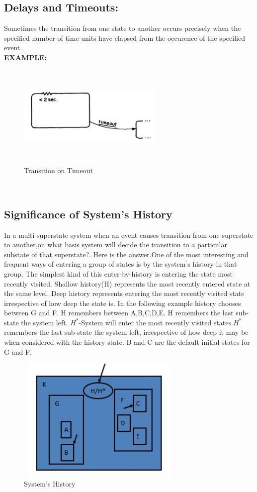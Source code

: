 \documentclass{article}
\begin{document}
\subsection{Delays and Timeouts:}
Sometimes the transition from one state to another occurs precisely when the specified number of time units have elapsed from the occurence of the specified event.\\
\textbf{EXAMPLE:}\\
\begin{figure}[h]
\centering
\includegraphics[width=7cm,height=5cm]{timeout.jpg}
\caption{Transition on Timeout}
\end{figure}\\

\subsection{Significance of System's History}
In a multi-superstate system when an event causes transition from one superstate to another,on what basis system will decide the transition to a particular substate of that superstate?. Here is the answer.One of the most interesting  and frequent  ways of entering  a group of states is by the system$^'$s history in that group.  The simplest  kind of this enter-by-history  is entering  the state most recently  visited. Shallow history(H) represents the most recently entered state at the same level. Deep history represents entering the most recently visited state irrespective of how deep the state is. In the following example history chooses between G and F. H remembers between A,B,C,D,E. H remembers the last sub-state the system left. $H^*$-System will enter the most recently visited states.$H^*$ remembers the last sub-state the system left, irrespective of how deep it may be when considered with the history state. B and C are the default initial states for G and F.
\begin{figure}[h]
\centering
\includegraphics[width=8cm,height=6cm]{Screenshot003.jpg}
\caption{System's History}
\end{figure}\\
\end{document}
